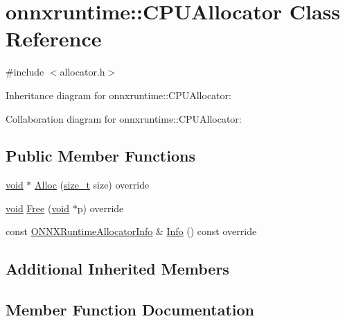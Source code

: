\hypertarget{classonnxruntime_1_1CPUAllocator}{}\section{onnxruntime\+:\+:C\+P\+U\+Allocator Class Reference}
\label{classonnxruntime_1_1CPUAllocator}


{\ttfamily \#include $<$allocator.\+h$>$}



Inheritance diagram for onnxruntime\+:\+:C\+P\+U\+Allocator\+:


Collaboration diagram for onnxruntime\+:\+:C\+P\+U\+Allocator\+:
\subsection*{Public Member Functions}
\begin{DoxyCompactItemize}
\item 
\mbox{\hyperlink{mlasi_8h_a88f941d423cb2a819b70a1358982b1a6}{void}} $\ast$ \mbox{\hyperlink{classonnxruntime_1_1CPUAllocator_a682cac57e48712c5c09506c21d92905c}{Alloc}} (\mbox{\hyperlink{mlasi_8h_a503efbc1c6e50825320ad909366b78ab}{size\+\_\+t}} size) override
\item 
\mbox{\hyperlink{mlasi_8h_a88f941d423cb2a819b70a1358982b1a6}{void}} \mbox{\hyperlink{classonnxruntime_1_1CPUAllocator_affe0e58d7fc048fb2cef9fc6704fdd91}{Free}} (\mbox{\hyperlink{mlasi_8h_a88f941d423cb2a819b70a1358982b1a6}{void}} $\ast$p) override
\item 
const \mbox{\hyperlink{structONNXRuntimeAllocatorInfo}{O\+N\+N\+X\+Runtime\+Allocator\+Info}} \& \mbox{\hyperlink{classonnxruntime_1_1CPUAllocator_a5eda291e0b728ea21d1f6893b5108020}{Info}} () const override
\end{DoxyCompactItemize}
\subsection*{Additional Inherited Members}


\subsection{Member Function Documentation}
\mbox{\label{classonnxruntime_1_1CPUAllocator_a682cac57e48712c5c09506c21d92905c}} 
